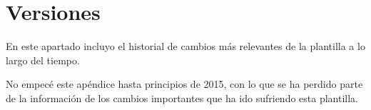 %
%
%
% 
%
%
%
%

\chapter{Versiones}
\label{cha:versiones}

En este apartado incluyo el historial de cambios más relevantes de la
plantilla a lo largo del tiempo.

No empecé este apéndice hasta principios de 2015, con lo que se ha
perdido parte de la información de los cambios importantes que ha ido
sufriendo esta plantilla.



